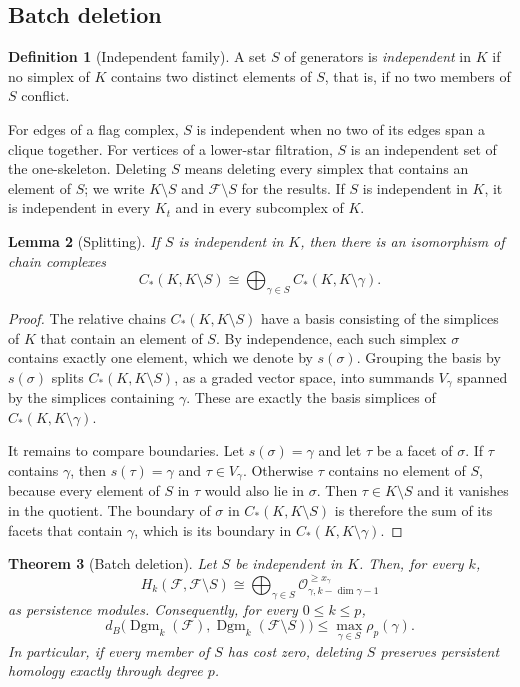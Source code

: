 \documentclass[11pt,letterpaper]{article}
\newtheorem{theorem}{Theorem}[section]
\newtheorem{lemma}[theorem]{Lemma}
\theoremstyle{definition}
\newtheorem{definition}[theorem]{Definition}
\newcommand{\Dgm}{\operatorname{Dgm}}
\newcommand{\Oc}{\mathcal O}
\begin{document}
\subsection{Batch deletion}

\begin{definition}[Independent family]
\label{def:independent}
A set $S$ of generators is \emph{independent} in $K$ if no simplex of $K$
contains two distinct elements of $S$, that is, if no two members of $S$
conflict.
\end{definition}

For edges of a flag complex, $S$ is independent when no two of its edges span
a clique together. For vertices of a lower-star filtration, $S$ is an
independent set of the one-skeleton. Deleting $S$ means deleting every
simplex that contains an element of $S$; we write $K\setminus S$ and
$\mathcal F\setminus S$ for the results. If $S$ is independent in $K$, it is
independent in every $K_t$ and in every subcomplex of $K$.

\begin{lemma}[Splitting]
\label{lem:splitting}
If $S$ is independent in $K$, then there is an isomorphism of chain complexes
$$
C_*(K,K\setminus S)\cong\bigoplus_{\gamma\in S}C_*(K,K\setminus\gamma).
$$
\end{lemma}

\begin{proof}
The relative chains $C_*(K,K\setminus S)$ have a basis consisting of the
simplices of $K$ that contain an element of $S$. By independence, each such
simplex $\sigma$ contains exactly one element, which we denote by $s(\sigma)$.
Grouping the basis by $s(\sigma)$ splits $C_*(K,K\setminus S)$, as a graded
vector space, into summands $V_\gamma$ spanned by the simplices containing
$\gamma$. These are exactly the basis simplices of $C_*(K,K\setminus\gamma)$.

It remains to compare boundaries. Let $s(\sigma)=\gamma$ and let $\tau$ be a
facet of $\sigma$. If $\tau$ contains $\gamma$, then $s(\tau)=\gamma$ and
$\tau\in V_\gamma$. Otherwise $\tau$ contains no element of $S$, because every
element of $S$ in $\tau$ would also lie in $\sigma$. Then $\tau\in
K\setminus S$ and it vanishes in the quotient. The boundary of $\sigma$ in
$C_*(K,K\setminus S)$ is therefore the sum of its facets that contain
$\gamma$, which is its boundary in $C_*(K,K\setminus\gamma)$.
\end{proof}

\begin{theorem}[Batch deletion]
\label{thm:batch}
Let $S$ be independent in $K$. Then, for every $k$,
$$
H_k(\mathcal F,\mathcal F\setminus S)
\cong
\bigoplus_{\gamma\in S}\Oc_{\gamma,k-\dim\gamma-1}^{\geq x_\gamma}
$$
as persistence modules. Consequently, for every $0\leq k\leq p$,
$$
d_B\bigl(\Dgm_k(\mathcal F),\Dgm_k(\mathcal F\setminus S)\bigr)
\leq\max_{\gamma\in S}\rho_p(\gamma).
$$
In particular, if every member of $S$ has cost zero, deleting $S$ preserves
persistent homology exactly through degree $p$.
\end{theorem}
\end{document}
